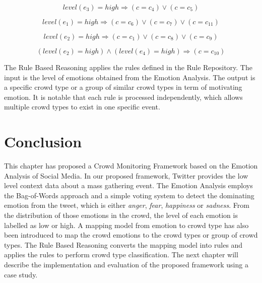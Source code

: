 \begin{equation}
\label{eq:rule2}
	level(e_3) = high \Rightarrow (c = c_4) \lor (c = c_5)
\end{equation}

\begin{equation}
\label{eq:rule3}
	level(e_1) = high \Rightarrow (c = c_6) \lor (c = c_7) \lor (c = c_{11})
\end{equation}

\begin{equation}
\label{eq:rule4}
	level(e_2) = high \Rightarrow (c = c_1) \lor (c = c_8) \lor (c = c_9)
\end{equation}

\begin{equation}
\label{eq:rule5}
	(level(e_2) = high) \land (level(e_4) = high) \Rightarrow (c = c_{10})
\end{equation}

The Rule Based Reasoning applies the rules defined in the Rule Repository. The input is the level of emotions obtained from the Emotion Analysis. The output is a specific crowd type or a group of similar crowd types in term of motivating emotion. It is notable that each rule is processed independently, which allows multiple crowd types to exist in one specific event.

\section{Conclusion}
This chapter has proposed a Crowd Monitoring Framework based on the Emotion Analysis of Social Media. In our proposed framework, Twitter provides the low level context data about a mass gathering event. The Emotion Analysis employs the Bag-of-Words approach and a simple voting system to detect the dominating emotion from the tweet, which is either \textit{anger}, \textit{fear}, \textit{happiness} or \textit{sadness}. From the distribution of those emotions in the crowd, the level of each emotion is labelled as low or high. A mapping model from emotion to crowd type has also been introduced to map the crowd emotions to the crowd types or group of crowd types. The Rule Based Reasoning converts the mapping model into rules and applies the rules to perform crowd type classification. The next chapter will describe the implementation and evaluation of the proposed framework using a case study.